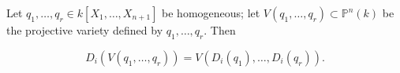 Let $q_1, \ldots, q_r \in k[X_1, \ldots, X_{n+1}]$ be homogeneous; let $V(q_1, \ldots, q_r) \subset \mathbb{P}^n(k)$ be the projective variety defined by $q_1, \ldots, q_r$. Then

$$D_i(V(q_1, \ldots, q_r)) = V(D_i(q_1), \ldots, D_i(q_r)).$$
